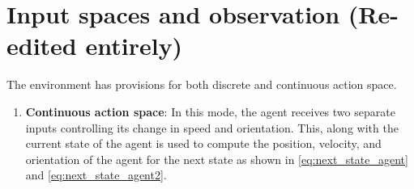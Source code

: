 \section{Input spaces and observation (Re-edited entirely)} 
\label{subsec:action-space}
The environment has provisions for both discrete and continuous action space.
\begin{enumerate}
    \item \textbf{Continuous action space}: In this mode, the agent receives two separate inputs controlling its change in speed and orientation. This, along with the current state of the agent is used to compute the position, velocity, and orientation of the agent for the next state as shown in \autoref{eq:next_state_agent} and \autoref{eq:next_state_agent2}.\\
    

\end{enumerate}
